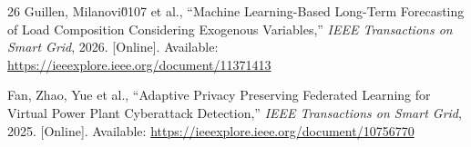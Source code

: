 \documentclass[journal]{IEEEtran}
\begin{document}
\begin{thebibliography}{26}
Guillen, Milanovi\u0107 et al., ``Machine Learning-Based Long-Term Forecasting of Load Composition Considering Exogenous Variables,'' \textit{IEEE Transactions on Smart Grid}, 2026. [Online]. Available: \url{https://ieeexplore.ieee.org/document/11371413}

Fan, Zhao, Yue et al., ``Adaptive Privacy Preserving Federated Learning for Virtual Power Plant Cyberattack Detection,'' \textit{IEEE Transactions on Smart Grid}, 2025. [Online]. Available: \url{https://ieeexplore.ieee.org/document/10756770}

\end{thebibliography}
\end{document}
